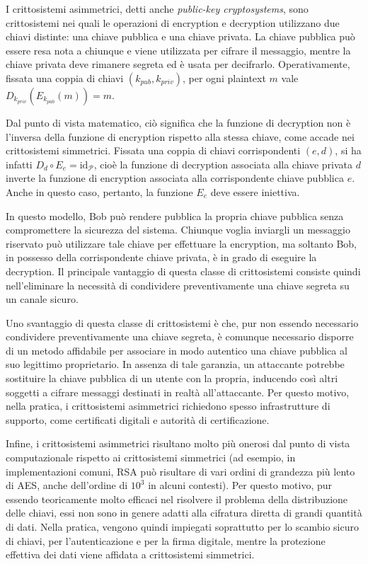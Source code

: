 I crittosistemi asimmetrici, detti anche \emph{public-key cryptosystems}, sono crittosistemi nei quali le operazioni di
encryption e decryption utilizzano due chiavi distinte: una chiave pubblica e una chiave privata. La chiave pubblica
può essere resa nota a chiunque e viene utilizzata per cifrare il messaggio, mentre la chiave privata deve rimanere
segreta ed è usata per decifrarlo. Operativamente, fissata una coppia di chiavi $(k_{pub}, k_{priv})$, per ogni
plaintext $m$ vale $D_{k_{priv}}(E_{k_{pub}}(m)) = m$.

Dal punto di vista matematico, ciò significa che la funzione di decryption non è l'inversa della funzione di encryption
rispetto alla stessa chiave, come accade nei crittosistemi simmetrici. Fissata una coppia di chiavi corrispondenti
$(e,d)$, si ha infatti $D_d \circ E_e = \mathrm{id}_{\mathcal P}$, cioè la funzione di decryption associata alla chiave
privata $d$ inverte la funzione di encryption associata alla corrispondente chiave pubblica $e$. Anche in questo caso,
pertanto, la funzione $E_e$ deve essere iniettiva.

In questo modello, Bob può rendere pubblica la propria chiave pubblica senza compromettere la sicurezza del sistema.
Chiunque voglia inviargli un messaggio riservato può utilizzare tale chiave per effettuare la encryption, ma soltanto
Bob, in possesso della corrispondente chiave privata, è in grado di eseguire la decryption. Il principale vantaggio di
questa classe di crittosistemi consiste quindi nell'eliminare la necessità di condividere preventivamente una chiave
segreta su un canale sicuro.

Uno svantaggio di questa classe di crittosistemi è che, pur non essendo necessario condividere preventivamente una
chiave segreta, è comunque necessario disporre di un metodo affidabile per associare in modo autentico una chiave
pubblica al suo legittimo proprietario. In assenza di tale garanzia, un attaccante potrebbe sostituire la chiave
pubblica di un utente con la propria, inducendo così altri soggetti a cifrare messaggi destinati in realtà
all'attaccante. Per questo motivo, nella pratica, i crittosistemi asimmetrici richiedono spesso infrastrutture di
supporto, come certificati digitali e autorità di certificazione.

Infine, i crittosistemi asimmetrici risultano molto più onerosi dal punto di vista computazionale rispetto ai
crittosistemi simmetrici (ad esempio, in implementazioni comuni, RSA può risultare di vari ordini di grandezza più
lento di AES, anche dell'ordine di $10^3$ in alcuni contesti). Per questo motivo, pur essendo teoricamente molto
efficaci nel risolvere il problema della distribuzione delle chiavi, essi non sono in genere adatti alla cifratura
diretta di grandi quantità di dati. Nella pratica, vengono quindi impiegati soprattutto per lo scambio sicuro di
chiavi, per l'autenticazione e per la firma digitale, mentre la protezione effettiva dei dati viene affidata a
crittosistemi simmetrici.

